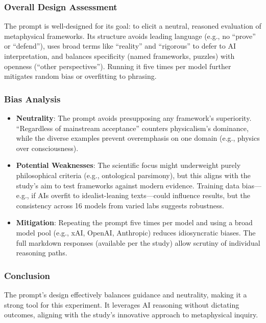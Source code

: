 \subsubsection{Overall Design
Assessment}\label{overall-design-assessment}

The prompt is well-designed for its goal: to elicit a neutral, reasoned
evaluation of metaphysical frameworks. Its structure avoids leading
language (e.g., no ``prove'' or ``defend''), uses broad terms like
``reality'' and ``rigorous'' to defer to AI interpretation, and balances
specificity (named frameworks, puzzles) with openness (``other
perspectives''). Running it five times per model further mitigates
random bias or overfitting to phrasing.

\subsubsection{Bias Analysis}\label{bias-analysis}

\begin{itemize}
\tightlist
\item
  \textbf{Neutrality}: The prompt avoids presupposing any framework's
  superiority. ``Regardless of mainstream acceptance'' counters
  physicalism's dominance, while the diverse examples prevent
  overemphasis on one domain (e.g., physics over consciousness).
\item
  \textbf{Potential Weaknesses}: The scientific focus might underweight
  purely philosophical criteria (e.g., ontological parsimony), but this
  aligns with the study's aim to test frameworks against modern
  evidence. Training data bias---e.g., if AIs overfit to
  idealist-leaning texts---could influence results, but the consistency
  across 16 models from varied labs suggests robustness.
\item
  \textbf{Mitigation}: Repeating the prompt five times per model and
  using a broad model pool (e.g., xAI, OpenAI, Anthropic) reduces
  idiosyncratic biases. The full markdown responses (available per the
  study) allow scrutiny of individual reasoning paths.
\end{itemize}

\subsubsection{Conclusion}\label{conclusion-1}

The prompt's design effectively balances guidance and neutrality, making
it a strong tool for this experiment. It leverages AI reasoning without
dictating outcomes, aligning with the study's innovative approach to
metaphysical inquiry.